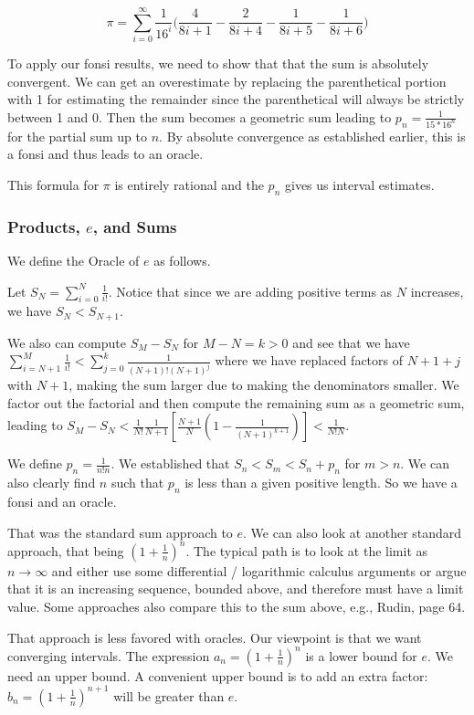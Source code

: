 \documentclass[12pt]{article}
\begin{document}
\[ 
\pi = \sum_{i=0}^\infty \frac{1}{16^i} \bigg( \frac{4}{8i+1} - \frac{2}{8i+4} - \frac{1}{8i+5} - \frac{1}{8i+6} \bigg)
\]


To apply our fonsi results, we need to show that that the sum is absolutely convergent. We can get an overestimate by replacing the parenthetical portion with 1 for estimating the remainder since the parenthetical will always be strictly between 1 and 0. Then the sum becomes a geometric sum leading to $p_n = \frac{1}{15*16^n}$ for the partial sum up to $n$. By absolute convergence as established earlier, this is a fonsi and thus leads to an oracle.  

This formula for $\pi$ is entirely rational and the $p_n$ gives us interval estimates.

\subsubsection{Products, $e$, and Sums}\label{sec:e}

We define the Oracle of $e$ as follows. 

Let $S_N = \sum_{i=0}^N \frac{1}{i!}$. Notice that since we are adding positive terms as $N$ increases, we have $S_N < S_{N+1}$. 

We also can compute $S_M - S_N$ for $M - N = k > 0$ and see that we have $\sum_{i=N+1}^M \frac{1}{i!} <  \sum_{j=0}^k  \frac{1}{(N+1)!(N+1)^j} $ where we have replaced factors of $N+1 + j$ with $N+1$, making the sum larger due to making the denominators smaller. We factor out the factorial and then compute the remaining sum as a geometric sum, leading to $S_M - S_N < \frac{1}{N!} \frac{1}{N+1} [\frac{N+1}{N} (1 - \frac{1}{(N+1)^{k+1}} )] < \frac{1}{N! N}$.

We define $p_n = \frac{1}{n!n}$. We established that $S_n < S_m < S_n + p_n$ for $m> n$. We can also clearly find $n$ such that $p_n$ is less than a given positive length. So we have a fonsi and an oracle. 

That was the standard sum approach to $e$. We can also look at another standard approach, that being $(1+\frac{1}{n})^n$. The typical path is to look at the limit as $n\to \infty$ and either use some differential / logarithmic calculus arguments or argue that it is an increasing sequence, bounded above, and therefore must have a limit value. Some approaches also compare this to the sum above, e.g., Rudin\cite{rudin}, page 64. 

That approach is less favored with oracles. Our viewpoint is that we want converging intervals. The expression $a_n = (1+\frac{1}{n})^n$ is a lower bound for $e$. We need an upper bound. A convenient upper bound is to add an extra factor: $b_n = (1+\frac{1}{n})^{n+1}$ will be greater than $e$. 
\end{document}
